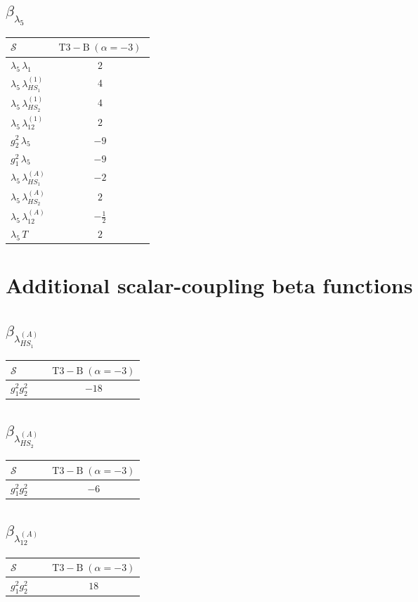 \documentclass[9pt]{article}
\begin{document}
\subsection*{$ \beta_{\lambda_5} $}
\begin{longtable}{@{}p{0.31\linewidth}c@{}}
\toprule
$\mathcal{S}$ & $ \mathrm{T3-B}\;(\alpha=-3) $ \\
\midrule
$ \lambda_5\,\lambda_1 $ & $ 2 $ \\
$ \lambda_5\,\lambda_{HS_1}^{(1)} $ & $ 4 $ \\
$ \lambda_5\,\lambda_{HS_2}^{(1)} $ & $ 4 $ \\
$ \lambda_5\,\lambda_{12}^{(1)} $ & $ 2 $ \\
$ g_2^2\,\lambda_5 $ & $ -9 $ \\
$ g_1^2\,\lambda_5 $ & $ -9 $ \\
$ \lambda_5\,\lambda_{HS_1}^{(A)} $ & $ -2 $ \\
$ \lambda_5\,\lambda_{HS_2}^{(A)} $ & $ 2 $ \\
$ \lambda_5\,\lambda_{12}^{(A)} $ & $ - \frac{1}{2} $ \\
$ \lambda_5\,T $ & $ 2 $ \\
\bottomrule
\end{longtable}
\section*{Additional scalar-coupling beta functions}
\subsection*{$ \beta_{\lambda_{HS_1}^{(A)}} $}
\begin{longtable}{@{}p{0.31\linewidth}c@{}}
\toprule
$\mathcal{S}$ & $ \mathrm{T3-B}\;(\alpha=-3) $ \\
\midrule
$ g_1^2g_2^2 $ & $ -18 $ \\
\bottomrule
\end{longtable}
\subsection*{$ \beta_{\lambda_{HS_2}^{(A)}} $}
\begin{longtable}{@{}p{0.31\linewidth}c@{}}
\toprule
$\mathcal{S}$ & $ \mathrm{T3-B}\;(\alpha=-3) $ \\
\midrule
$ g_1^2g_2^2 $ & $ -6 $ \\
\bottomrule
\end{longtable}
\subsection*{$ \beta_{\lambda_{12}^{(A)}} $}
\begin{longtable}{@{}p{0.31\linewidth}c@{}}
\toprule
$\mathcal{S}$ & $ \mathrm{T3-B}\;(\alpha=-3) $ \\
\midrule
$ g_1^2g_2^2 $ & $ 18 $ \\
\bottomrule
\end{longtable}
\end{document}
